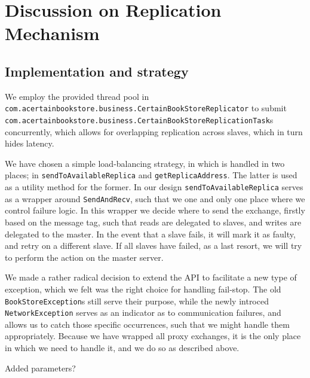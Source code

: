 
\section{Discussion on Replication Mechanism}

\subsection{Implementation and strategy}
We employ the provided thread pool in
{\tt com.acertainbookstore.business.CertainBookStoreReplicator} to submit
{\tt com.acertainbookstore.business.CertainBookStoreReplicationTask}s concurrently,
which allows for overlapping replication across slaves, which in turn hides
latency.

We have chosen a simple load-balancing strategy, in which is handled in two
places; in {\tt sendToAvailableReplica} and {\tt getReplicaAddress}. The latter
is used as a utility method for the former. In our design
{\tt sendToAvailableReplica} serves as a wrapper around {\tt SendAndRecv}, such
that we one and only one place where we control failure logic. In this wrapper
we decide where to send the exchange, firstly based on the message tag, such
that reads are delegated to slaves, and writes are delegated to the master. In
the event that a slave fails, it will mark it as faulty, and retry on a different
slave. If all slaves have failed, as a last resort, we will try to perform the
action on the master server.

We made a rather radical decision to extend the API to facilitate a new type of
exception, which we felt was the right choice for handling fail-stop. The old
{\tt BookStoreException}s still serve their purpose, while the newly introced
{\tt NetworkException} serves as an indicator as to communication failures, and
allows us to catch those specific occurrences, such that we might handle them
appropriately. Because we have wrapped all proxy exchanges, it is the only
place in which we need to handle it, and we do so as described above.

Added parameters?

